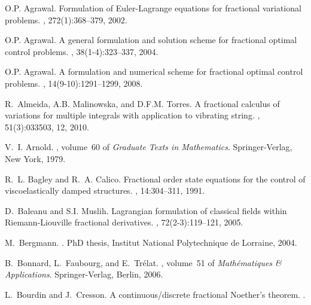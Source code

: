\documentclass[english,11pt,reqno]{smfart}
\begin{document}

\begin{thebibliography}{10}

O.P. Agrawal.
\newblock Formulation of {E}uler-{L}agrange equations for fractional
  variational problems.
, 272(1):368--379, 2002.

O.P. Agrawal.
\newblock A general formulation and solution scheme for fractional optimal
  control problems.
, 38(1-4):323--337, 2004.

O.P. Agrawal.
\newblock A formulation and numerical scheme for fractional optimal control
  problems.
, 14(9-10):1291--1299, 2008.

R.~Almeida, A.B. Malinowska, and D.F.M. Torres.
\newblock A fractional calculus of variations for multiple integrals with
  application to vibrating string.
, 51(3):033503, 12, 2010.

V.~I. Arnold.
, volume~60 of {\em
  Graduate Texts in Mathematics}.
\newblock Springer-Verlag, New York, 1979.

R.~L. Bagley and R.~A. Calico.
\newblock Fractional order state equations for the control of viscoelastically
  damped structures.
, 14:304--311, 1991.

D.~Baleanu and S.I. Muslih.
\newblock Lagrangian formulation of classical fields within
  {R}iemann-{L}iouville fractional derivatives.
, 72(2-3):119--121, 2005.

M.~Bergmann.
.
\newblock PhD thesis, Institut National Polytechnique de Lorraine, 2004.

B.~Bonnard, L.~Faubourg, and E.~Tr{\'e}lat.
,
  volume~51 of {\em Math\'ematiques \& Applications}.
\newblock Springer-Verlag, Berlin, 2006.

L.~Bourdin and J.~Cresson.
\newblock A continuous/discrete fractional {N}oether's theorem.
.


\end{thebibliography}
\end{document}
